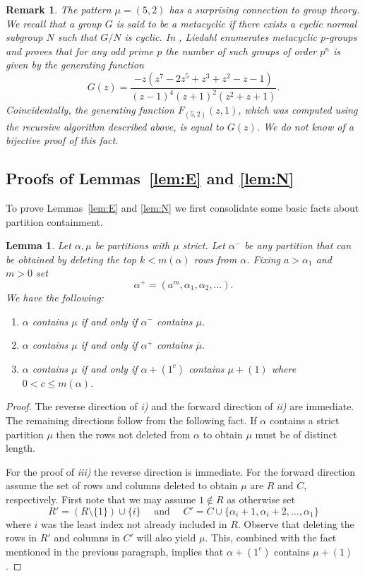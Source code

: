 \documentclass{article}
\theoremstyle{plain}
\newtheorem{lemma}[theorem]{Lemma}
\newtheorem{remark}[theorem]{Remark}
\theoremstyle{definition}
\renewcommand{\ne}[1]{\overline{#1}}
\begin{document}
\begin{remark}\label{rmk:metacyclic}
The pattern $\mu = (5,2)$ has a surprising connection to group theory.  We recall that a group $G$ is said to be a metacyclic if there exists a cyclic normal subgroup $N$ such that $G/N$ is cyclic.  In \cite{Liedahl:Enume1996}, Liedahl enumerates metacyclic $p$-groups and proves that for any odd prime $p$ the number of such groups of order $p^n$ is given by the generating function
$$G(z) = \frac{-z(z^7 - 2z^5 + z^3 + z^2 - z - 1)}{(z - 1)^4(z + 1)^2(z^2 + z + 1)}.$$
Coincidentally, the generating function $F_{(5,2)}(z,1)$, which was computed using the  recursive algorithm described above, is equal to $G(z)$.   We do not know of a bijective proof of this fact.
\end{remark}


\subsection{Proofs of Lemmas~\ref{lem:E} and \ref{lem:N}}\label{sec:lemmas 1 and 2}

To prove Lemmas~\ref{lem:E} and \ref{lem:N} we first consolidate some basic facts about partition containment.   

\begin{lemma}\label{lem:list of prop}
Let $\alpha,\mu$ be partitions with $\mu$ strict.  Let $\alpha^-$ be any partition that can be obtained by deleting the top $k<m(\alpha)$ rows from $\alpha$.  Fixing $a>\alpha_1$ and $m>0$ set
$$\alpha^+ = (a^m, \alpha_1,\alpha_2,\ldots).$$
We have the following:
\begin{enumerate}[label=\roman*)]
	\item $\alpha$  contains $\mu$ if and only if $\alpha^-$ contains $\mu$.
	\item $\alpha$ contains $\mu$ if and only if $\alpha^+$ contains $\ne\mu$.
	\item $\alpha$ contains $\mu$ if and only if $\alpha+(1^c)$ contains $\mu+(1)$ where $0<c\leq m(\alpha)$.  
\end{enumerate}
\end{lemma}

\begin{proof}
The reverse direction of \emph{i)} and the forward direction of \emph{ii)} are immediate.  The remaining directions follow from the following fact.  If $\alpha$ contains a strict partition $\mu$ then the rows not deleted from $\alpha$ to obtain $\mu$ must be of distinct length.  

For the proof of \emph{iii)} the reverse direction is immediate.  For the forward direction assume the set of rows and columns deleted to obtain $\mu$ are $R$ and $C$, respectively.  First note that we may assume $1\notin R$ as otherwise set
$$R'= (R \setminus \{1\}) \cup \{i\} \quad\textrm{ and }\quad C'=C\cup \{\alpha_i+1,\alpha_i+2,\ldots, \alpha_1\}$$
where $i$ was the least index not already included in $R$. 
Observe that deleting the rows in $R'$ and columns in $C'$ will also yield $\mu$.  This, combined with the fact mentioned in the previous paragraph, implies that $\alpha+(1^c)$ contains $\mu+(1)$.
\end{proof}
\end{document}
